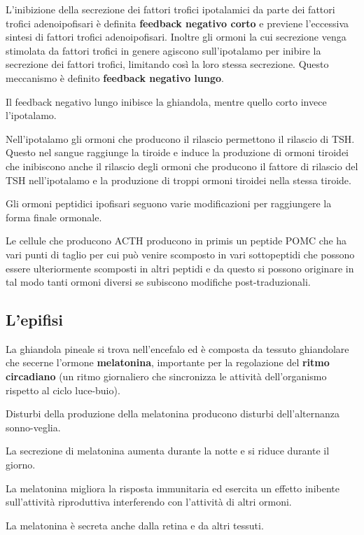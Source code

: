 \documentclass[]{article}
\begin{document}
L'inibizione della secrezione dei fattori trofici ipotalamici da parte
dei fattori trofici adenoipofisari è definita \textbf{feedback negativo
corto} e previene l'eccessiva sintesi di fattori trofici adenoipofisari.
Inoltre gli ormoni la cui secrezione venga stimolata da fattori trofici
in genere agiscono sull'ipotalamo per inibire la secrezione dei fattori
trofici, limitando così la loro stessa secrezione. Questo meccanismo è
definito \textbf{feedback negativo lungo}.

Il feedback negativo lungo inibisce la ghiandola, mentre quello corto
invece l'ipotalamo.

Nell'ipotalamo gli ormoni che producono il rilascio permettono il
rilascio di TSH. Questo nel sangue raggiunge la tiroide e induce la
produzione di ormoni tiroidei che inibiscono anche il rilascio degli
ormoni che producono il fattore di rilascio del TSH nell'ipotalamo e la
produzione di troppi ormoni tiroidei nella stessa tiroide.

Gli ormoni peptidici ipofisari seguono varie modificazioni per
raggiungere la forma finale ormonale.

Le cellule che producono ACTH producono in primis un peptide POMC che ha
vari punti di taglio per cui può venire scomposto in vari sottopeptidi
che possono essere ulteriormente scomposti in altri peptidi e da questo
si possono originare in tal modo tanti ormoni diversi se subiscono
modifiche post-traduzionali.

\subsection{L'epifisi}\label{lepifisi}

La ghiandola pineale si trova nell'encefalo ed è composta da tessuto
ghiandolare che secerne l'ormone \textbf{melatonina}, importante per la
regolazione del \textbf{ritmo circadiano} (un ritmo giornaliero che
sincronizza le attività dell'organismo rispetto al ciclo luce-buio).

Disturbi della produzione della melatonina producono disturbi
dell'alternanza sonno-veglia.

La secrezione di melatonina aumenta durante la notte e si riduce durante
il giorno.

La melatonina migliora la risposta immunitaria ed esercita un effetto
inibente sull'attività riproduttiva interferendo con l'attività di altri
ormoni.

La melatonina è secreta anche dalla retina e da altri tessuti.
\end{document}
